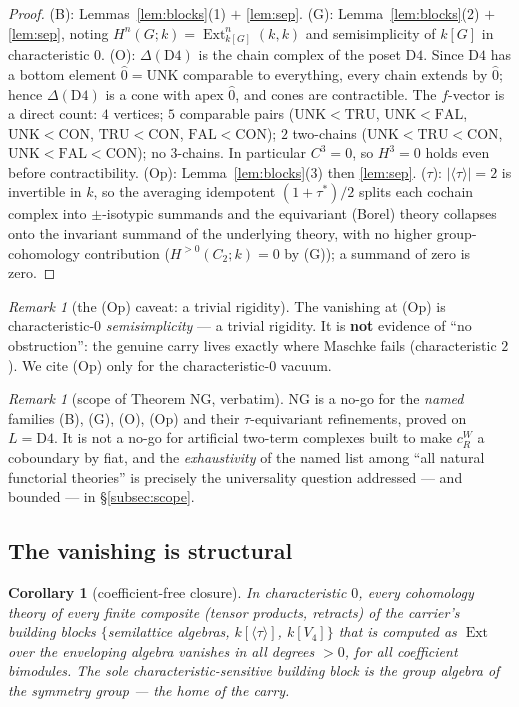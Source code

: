 \documentclass[11pt]{article}
\newtheorem{corollary}[theorem]{Corollary}
\theoremstyle{definition}
\theoremstyle{remark}
\newtheorem{remark}[theorem]{Remark}
\newcommand{\UNK}{\mathrm{UNK}}
\newcommand{\TRU}{\mathrm{TRU}}
\newcommand{\FAL}{\mathrm{FAL}}
\newcommand{\CON}{\mathrm{CON}}
\newcommand{\Dfour}{\mathrm{D4}}
\newcommand{\Ext}{\operatorname{Ext}}
\newcommand{\cR}{c_R^W}
\begin{document}
\begin{proof}
(B): Lemmas~\ref{lem:blocks}(1) $+$ \ref{lem:sep}. (G): Lemma~\ref{lem:blocks}(2) $+$ \ref{lem:sep}, noting $H^n(G;k)=\Ext^n_{k[G]}(k,k)$ and semisimplicity of $k[G]$ in characteristic $0$. (O): $\Delta(\Dfour)$ is the chain complex of the poset $\Dfour$. Since $\Dfour$ has a bottom element $\hat0=\UNK$ comparable to everything, every chain extends by $\hat0$; hence $\Delta(\Dfour)$ is a cone with apex $\hat0$, and cones are contractible. The $f$-vector is a direct count: $4$ vertices; $5$ comparable pairs ($\UNK{<}\TRU$, $\UNK{<}\FAL$, $\UNK{<}\CON$, $\TRU{<}\CON$, $\FAL{<}\CON$); $2$ two-chains ($\UNK{<}\TRU{<}\CON$, $\UNK{<}\FAL{<}\CON$); no $3$-chains. In particular $C^3=0$, so $H^3=0$ holds even before contractibility. (Op): Lemma~\ref{lem:blocks}(3) then \ref{lem:sep}. ($\tau$): $|\langle\tau\rangle|=2$ is invertible in $k$, so the averaging idempotent $(1+\tau^*)/2$ splits each cochain complex into $\pm$-isotypic summands and the equivariant (Borel) theory collapses onto the invariant summand of the underlying theory, with no higher group-cohomology contribution ($H^{>0}(C_2;k)=0$ by (G)); a summand of zero is zero.
\end{proof}

\begin{remark}[the (Op) caveat: a trivial rigidity]
The vanishing at (Op) is characteristic-$0$ \emph{semisimplicity} --- a trivial rigidity. It is \textbf{not} evidence of ``no obstruction'': the genuine carry lives exactly where Maschke fails (characteristic $2$). We cite (Op) only for the characteristic-$0$ vacuum.
\end{remark}

\begin{remark}[scope of Theorem NG, verbatim]\label{rem:ngscope}
NG is a no-go for the \emph{named} families (B), (G), (O), (Op) and their $\tau$-equivariant refinements, proved on $L=\Dfour$. It is not a no-go for artificial two-term complexes built to make $\cR$ a coboundary by fiat, and the \emph{exhaustivity} of the named list among ``all natural functorial theories'' is precisely the universality question addressed --- and bounded --- in \S\ref{subsec:scope}.
\end{remark}

\subsection{The vanishing is structural}

\begin{corollary}[coefficient-free closure]\label{cor:closure}
In characteristic $0$, every cohomology theory of every finite composite (tensor products, retracts) of the carrier's building blocks $\{$semilattice algebras, $k[\langle\tau\rangle]$, $k[V_4]\}$ that is computed as $\Ext$ over the enveloping algebra vanishes in all degrees $>0$, for all coefficient bimodules. The sole characteristic-sensitive building block is the group algebra of the symmetry group --- the home of the carry.
\end{corollary}
\end{document}
